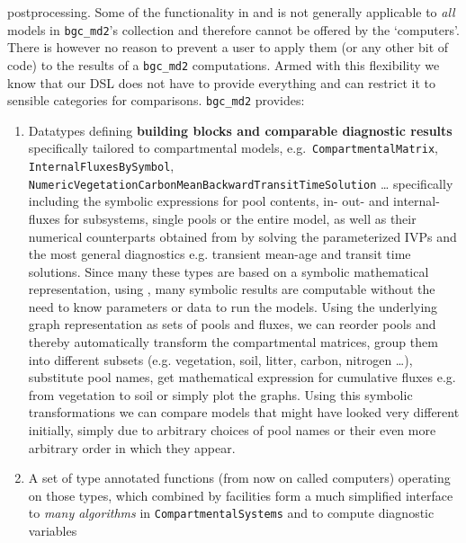 postprocessing. Some of the functionality in \LAPM and \CompartmentalSystems is
not generally applicable to \emph{all} models in \texttt{bgc\_md2}'s collection
and therefore cannot be offered by the `computers'. There is however no reason
to prevent a user to apply them (or any other bit of code) to the results of a
\texttt{bgc\_md2} computations.  Armed with this flexibility we know that our
DSL does not have to provide everything and can restrict it to sensible categories
for comparisons.
\texttt{bgc\_md2} provides:
  \begin{enumerate}
    \item
      Datatypes defining {\bf building blocks and comparable diagnostic results} 
      specifically tailored to compartmental models, 
      e.g.\ \texttt{CompartmentalMatrix}, \texttt{InternalFluxesBySymbol},
      \texttt{NumericVegetationCarbonMeanBackwardTransitTimeSolution} \dots  
      specifically including the symbolic expressions for pool contents, in- out- and internal-fluxes for
      subsystems, single pools or the entire model, as well as their numerical counterparts obtained from 
      by solving the parameterized IVPs and the most general diagnostics e.g. transient mean-age and transit time solutions.
      Since many these types are based on a symbolic
      mathematical representation, using \sympy, many symbolic results are computable 
      without the need to know parameters or data to run the models.
      Using the underlying graph representation as sets of pools and fluxes, we can reorder pools and thereby automatically transform the compartmental matrices, group them into different subsets (e.g. vegetation, soil, litter, carbon, nitrogen \dots ), substitute pool names, get mathematical expression for cumulative fluxes e.g. from vegetation to soil or simply plot the graphs.
      Using this symbolic transformations we can compare models that might have looked very different initially, simply due to arbitrary choices of pool names or their even more arbitrary order in which they appear. 
    \item
      A set of type annotated functions (from now on called computers) operating on those types,  which combined
      by \ComputabilityGraphs facilities form a much simplified 
      interface to \emph{many  algorithms} in \texttt{CompartmentalSystems} and \LAPM to compute diagnostic variables

\end{enumerate}

